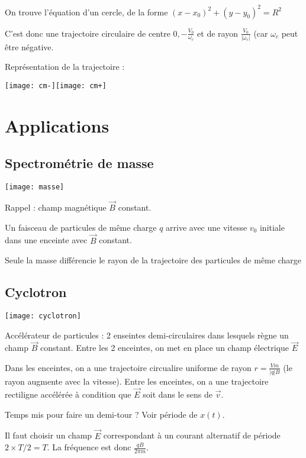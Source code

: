 \documentclass[french]{yLectureNote}
\renewcommand{\vec}{\overrightarrow}
\begin{document}
On trouve l'équation d'un cercle, de la forme $(x-x_0)^2+(y-y_0)^2 = R^2$

C'est donc une trajectoire circulaire de centre $0, -\frac{V_0}{\omega_c}$ et de rayon $\frac{V_0}{|\omega_c|}$ (car $\omega_c$ peut \^etre négative.

Représentation de la trajectoire :

\texttt{[image: cm-]}\texttt{[image: cm+]}
\section{Applications}
\subsection{Spectrométrie de masse}
\texttt{[image: masse]}

Rappel : champ magnétique $\vec{B}$ constant.


Un faisceau de particules de m\^eme charge $q$ arrive avec une vitesse $v_0$ initiale dans une enceinte avec $\vec{B}$ constant.

Seule la masse différencie le rayon de la trajectoire des particules de m\^eme charge


\subsection{Cyclotron}
\texttt{[image: cyclotron]}

Accélérateur de particules : 2 enseintes demi-circulaires dans lesquels règne un champ $\vec{B}$ constant. Entre les 2 enceintes, on met en place un champ électrique $\vec{E}$

Dans les enceintes, on a une trajectoire circualire uniforme de rayon $r=\frac{Vm}{|q|B}$ (le rayon augmente avec la vitesse). Entre les enceintes, on a une trajectoire rectiligne accélérée à condition que $\vec{E}$ soit dans le sens de $\vec{v}$.

Temps mis pour faire un demi-tour ? Voir période de $x(t)$.

Il faut choisir un champ $\vec{E}$ correspondant à un courant alternatif de période $2\times T/2 = T$. La fréquence est donc $\frac{qB}{2\pi m}$.
\end{document}
